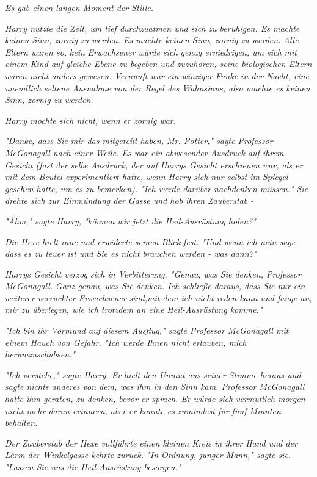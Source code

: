 {\emph{Es gab einen langen Moment der Stille.}

\emph{Harry nutzte die Zeit, um tief durchzuatmen und sich zu beruhigen. Es machte keinen Sinn, zornig zu werden. Es machte keinen Sinn, zornig zu werden.} \emph{\emph{Alle}} \emph{Eltern waren so,} \emph{\emph{kein}} \emph{Erwachsener würde sich genug erniedrigen, um sich mit einem Kind auf gleiche Ebene zu begeben und zuzuhören, seine biologischen Eltern wären nicht anders gewesen. Vernunft war ein winziger Funke in der Nacht, eine unendlich seltene Ausnahme von der Regel des Wahnsinns, also machte es keinen Sinn, zornig zu werden.}

\emph{Harry mochte sich nicht, wenn er zornig war.}

\emph{"Danke, dass Sie mir das mitgeteilt haben, Mr. Potter," sagte Professor McGonagall nach einer Weile. Es war ein abwesender Ausdruck auf ihrem Gesicht (fast der selbe Ausdruck, der auf Harrys Gesicht erschienen war, als er mit dem Beutel experimentiert hatte, wenn Harry sich nur selbst im Spiegel gesehen hätte, um es zu bemerken). "Ich werde darüber nachdenken müssen." Sie drehte sich zur Einmündung der Gasse und hob ihren Zauberstab -}

\emph{"Ähm," sagte Harry, "können wir jetzt die Heil-Ausrüstung holen?"}

\emph{Die Hexe hielt inne und erwiderte seinen Blick fest. "Und wenn ich nein sage - dass es zu teuer ist und Sie es nicht brauchen werden - was dann?"}

\emph{Harrys Gesicht verzog sich in Verbitterung. "Genau, was Sie denken, Professor McGonagall.} \emph{\emph{Ganz genau}\emph{,}} \emph{was Sie denken. Ich schließe daraus, dass Sie nur ein weiterer verrückter Erwachsener sind,mit dem ich nicht reden kann und fange an, mir zu überlegen, wie ich trotzdem an eine Heil-Ausrüstung komme."}

\emph{"Ich bin ihr Vormund auf diesem Ausflug," sagte Professor McGonagall mit einem Hauch von Gefahr. "Ich werde Ihnen} \emph{\emph{nicht}} \emph{erlauben, mich herumzuschubsen."}

\emph{"Ich verstehe," sagte Harry. Er hielt den Unmut aus seiner Stimme heraus und sagte nichts anderes von dem, was ihm in den Sinn kam. Professor McGonagall hatte ihm geraten, zu denken, bevor er sprach. Er würde sich vermutlich morgen nicht mehr daran erinnern, aber er konnte es zumindest für fünf Minuten behalten.}

\emph{Der Zauberstab der Hexe vollführte einen kleinen Kreis in ihrer Hand und der Lärm der Winkelgasse kehrte zurück. "In Ordnung, junger Mann," sagte sie. "Lassen Sie uns die Heil-Ausrüstung besorgen."}

}
